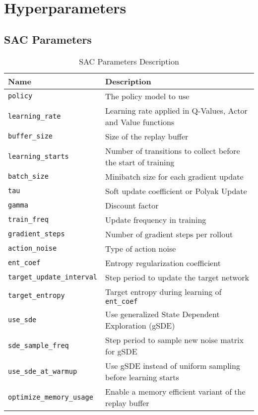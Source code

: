 \chapter{Hyperparameters} \label{appendix1}

\section{\ac{SAC} Parameters}

\begin{table}[ht!]
	\centering
	\caption{\ac{SAC} Parameters Description}
	\begin{tabular}{lp{8cm}}
		\toprule
		\textbf{Name} & \textbf{Description} \\
		\midrule
		\texttt{policy} & The policy model to use  \\
		\texttt{learning\_rate} & Learning rate applied in Q-Values, Actor and Value functions \\
		\texttt{buffer\_size} & Size of the replay buffer \\
		\texttt{learning\_starts} & Number of transitions to collect before the start of training \\
		\texttt{batch\_size} &  Minibatch size for each gradient update\\
		\texttt{tau} &  Soft update coefficient or Polyak Update \\
		\texttt{gamma} & Discount factor \\
		\texttt{train\_freq} &  Update frequency in training \\
		\texttt{gradient\_steps} & Number of gradient steps per rollout \\
		\texttt{action\_noise} & Type of action noise \\
		\texttt{ent\_coef} & Entropy regularization coefficient \\
		\texttt{target\_update\_interval} &  Step period to update the target network \\
		\texttt{target\_entropy} & Target entropy during learning of \texttt{ent\_coef} \\
		\texttt{use\_sde} &  Use generalized State Dependent Exploration (gSDE) \\
		\texttt{sde\_sample\_freq} & Step period to sample new noise matrix for gSDE \\
		\texttt{use\_sde\_at\_warmup} &  Use gSDE instead of uniform sampling before learning starts \\
		\texttt{optimize\_memory\_usage} & Enable a memory efficient variant of the replay buffer

\end{tabular}
\end{table}
